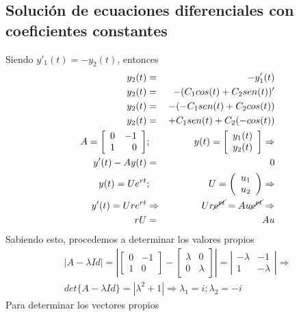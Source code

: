 \documentclass[12pt,spanish,lettersize]{report}
\begin{document}
\subsection{Soluci\'on de ecuaciones diferenciales con coeficientes constantes}
Siendo $y'_1(t)=-y_2(t)$, entonces
\begin{eqnarray}
\nonumber y_2(t)&=&-y'_1(t)\\
\nonumber y_2(t)&=&-(C_1cos(t)+C_2sen(t))'\\
\nonumber y_2(t)&=&-(-C_1sen(t)+C_2cos(t))\\
\nonumber y_2(t)&=&+C_1sen(t)+C_2(-cos(t))\\
\nonumber A=\left[
\begin{array}{rr}
0 & -1\\
1 & 0
\end{array}
\right]&;&y(t)=\left[
\begin{array}{c}
y_1(t)\\
y_2(t)
\end{array}
\right]\Rightarrow\\
\nonumber y'(t)-Ay(t)&=&0\\
\nonumber y(t)=Ue^{rt}&;&U=\left(
\begin{array}{c}
u_1\\
u_2
\end{array}
\right)\Rightarrow\\
\nonumber y'(t)=Ure^{rt}&\Rightarrow&Ur\cancel{e^{rt}}=Au\cancel{e^{rt}}\Rightarrow\\
\nonumber rU&=&Au
\end{eqnarray}
Sabiendo esto, procedemos a determinar los valores propios
\begin{eqnarray}
\nonumber |A-\lambda Id| = 
\left|\left[
\begin{array}{cc}
0 & -1\\
1 & 0
\end{array}
\right]-\left[
\begin{array}{cc}
\lambda & 0\\
0 & \lambda
\end{array}
\right]\right| = \left|
\begin{array}{cc}
-\lambda & -1\\
1 & -\lambda
\end{array}
\right|\Rightarrow\\
det\{A -\lambda Id\}=|\lambda^2+1|\Rightarrow \lambda_1=i; \lambda_2=-i
\end{eqnarray}
Para determinar los vectores propios
\end{document}

